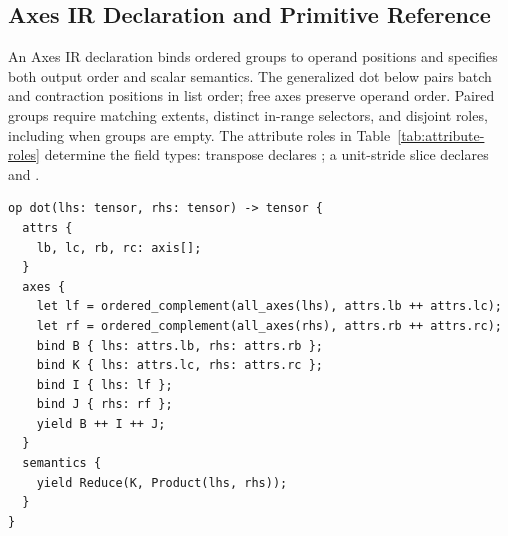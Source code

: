 \subsection{Axes IR Declaration and Primitive Reference}
\label{app:axes-ir-declarations-primitives}
\label{app:language-declarations}
An Axes IR declaration binds ordered groups to operand positions and
specifies both output order and scalar semantics. The generalized dot below
pairs batch and contraction positions in list order; free axes preserve
operand order. Paired groups require matching extents, distinct in-range
selectors, and disjoint roles, including when groups are empty.
The attribute roles in Table~\ref{tab:attribute-roles} determine the field
types: transpose declares ; a unit-stride slice
declares  and .

\begin{lstlisting}[language=TEPL,
  caption={Axes IR representation of generalized dot, with explicit attributes, axis bindings, and value semantics.},
  label={lst:dot-declaration}]
op dot(lhs: tensor, rhs: tensor) -> tensor {
  attrs {
    lb, lc, rb, rc: axis[];
  }
  axes {
    let lf = ordered_complement(all_axes(lhs), attrs.lb ++ attrs.lc);
    let rf = ordered_complement(all_axes(rhs), attrs.rb ++ attrs.rc);
    bind B { lhs: attrs.lb, rhs: attrs.rb };
    bind K { lhs: attrs.lc, rhs: attrs.rc };
    bind I { lhs: lf };
    bind J { rhs: rf };
    yield B ++ I ++ J;
  }
  semantics {
    yield Reduce(K, Product(lhs, rhs));
  }
}
\end{lstlisting}

